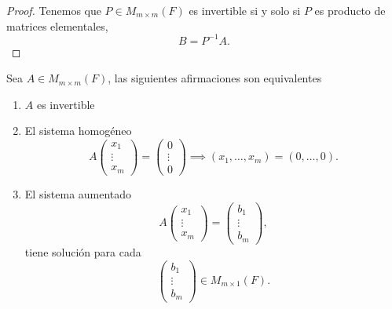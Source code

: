 \documentclass[12pt,a4paper]{book}
\begin{document}
    \begin{proof}
        Tenemos que $P\in M_{m\times m}(F)$ es invertible si y solo si $P$ es producto de matrices elementales,
        \begin{equation*}
            B=P^{-1}A.
        \end{equation*}
    \end{proof}

    \begin{teorema}
    \label{teo:4}
        Sea $A\in M_{m\times m}(F)$, las siguientes afirmaciones son equivalentes
        \begin{enumerate}
            \item[$(i)$] $A$ es invertible
            \item[$(ii)$] El sistema homogéneo
            \begin{equation*}
                A
                \begin{pmatrix}
                    x_{1}\\
                    \vdots\\
                    x_{m}
                \end{pmatrix}
                =
                \begin{pmatrix}
                    0\\
                    \vdots\\
                    0
                \end{pmatrix}
                \implies (x_{1},\dots,x_{m})=(0,\dots,0).
            \end{equation*}
            \item[$(iii)$] El sistema aumentado
            \begin{equation*}
                A
                \begin{pmatrix}
                    x_{1}\\
                    \vdots\\
                    x_{m}
                \end{pmatrix}
                =
                \begin{pmatrix}
                    b_{1}\\
                    \vdots\\
                    b_{m}
                \end{pmatrix},
            \end{equation*}
            tiene solución para cada
            \begin{equation*}
                \begin{pmatrix}
                    b_{1}\\
                    \vdots\\
                    b_{m}
                \end{pmatrix}
                \in M_{m\times 1}(F).
            \end{equation*}
        \end{enumerate}
    \end{teorema}
\end{document}
